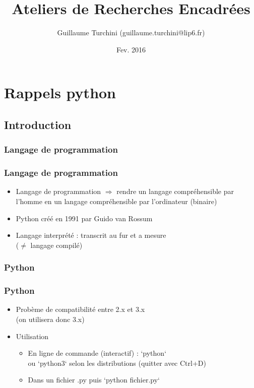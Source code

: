 \documentclass{beamer}
\title[Cours ARE]{Ateliers de Recherches Encadrées}
\author[Guillaume Turchini]{Guillaume Turchini (guillaume.turchini@lip6.fr)}
\institute{SmartGrid}
\date{Fev. 2016}
\let\oldsubsubsection\subsubsection
\renewcommand{\subsubsection}[2][]{\def\currentsubsubsection{#2}\oldsubsubsection[#1]{#2}}
\begin{document}
\begin{frame}
  \titlepage
\end{frame}

\begin{frame}
  \setcounter{tocdepth}{2}
  \tableofcontents
  \setcounter{tocdepth}{4}
\end{frame}

\let\oldframe\frame
\let\endoldframe\endframe
\renewenvironment{frame}{\oldframe\frametitle{\currentsubsubsection}}{\endoldframe}

\section{Rappels python}
\subsection{Introduction}

\subsubsection{Langage de programmation}

\begin{frame}
  \begin{itemize}
    \item Langage de programmation $\Rightarrow$ rendre un langage compréhensible par l'homme en un langage compréhensible par l'ordinateur (binaire)
    \item Python créé en 1991 par Guido van Rossum
    \item Langage interprété : transcrit au fur et a mesure\\($\neq$ langage compilé)
  \end{itemize}
\end{frame}

\subsubsection{Python}

\begin{frame}
    \begin{itemize}
        \item Probème de compatibilité entre 2.x et 3.x\\(on utilisera donc 3.x)
      
        \item Utilisation
        \begin{itemize}
            \item En ligne de commande (interactif) : `python` \\
            ou `python3` selon les distributions
            (quitter avec Ctrl+D)
          
            \item Dans un fichier .py puis `python fichier.py`
        \end{itemize}
    \end{itemize}
\end{frame}
\end{document}
